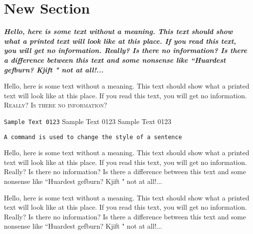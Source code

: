 \documentclass[a4paper,12pt]{article}
\begin{document}
\section{New Section}

\textit{\textbf{Hello, here is some text without a meaning.  This text should 
show what a printed text will look like at this place.  If you 
read this text, you will get no information.  Really?  Is there 
no information?  Is there a difference between this text and some 
nonsense like ``Huardest gefburn?  Kjift " not at all!...}}

Hello, {\tiny here is some text without a meaning. } This text should 
show what a printed text will look like at {\huge this place.}  If you 
read this text, \footnotesize you will get no information. 
\textsc{Really?  Is there 
no information?}

\texttt{Sample Text 0123}
\textsf{Sample Text 0123}
\textrm{Sample Text 0123}

\texttt{A command is used to change the style 
of a sentence}



Hello, here is some text without a meaning.  This text should 
show what a printed text will look like at this place.  If you 
read this text, you will get no information.  Really?  Is there 
no information?  Is there a difference between this text and some 
nonsense like ``Huardest gefburn?  Kjift " not at all!...

Hello, here is some text without a meaning.  This text should 
show what a printed text will look like at this place.  If you 
read this text, you will get no information.  Really?  Is there 
no information?  Is there a difference between this text and some 
nonsense like ``Huardest gefburn?  Kjift " not at all!...
\end{document}

